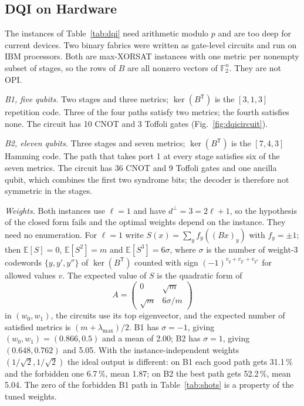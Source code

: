 \documentclass[journal]{IEEEtran}
\begin{document}
\subsection{DQI on Hardware}
\label{sec:hw}

The instances of Table~\ref{tab:dqi} need arithmetic modulo $p$ and are too deep for current devices. Two binary fabrics were written as gate-level circuits and run on IBM processors. %
Both are max-XORSAT instances with one metric per nonempty subset of stages, so the rows of $B$ are all nonzero vectors of $\mathbb{F}_{2}^{n}$. They are not OPI.

\emph{B1, five qubits.} Two stages and three metrics; $\ker(B^{\mathsf T})$ is the $[3,1,3]$ repetition code. Three of the four paths satisfy two metrics; the fourth satisfies none. The circuit has 10 CNOT and 3 Toffoli gates (Fig.~\ref{fig:dqicircuit}).

\emph{B2, eleven qubits.} Three stages and seven metrics; $\ker(B^{\mathsf T})$ is the $[7,4,3]$ Hamming code. The path that takes port 1 at every stage satisfies six of the seven metrics. The circuit has 36 CNOT and 9 Toffoli gates and one ancilla qubit, which combines the first two syndrome bits; the decoder is therefore not symmetric in the stages.

\emph{Weights.} Both instances use $\ell=1$ and have $d^{\perp}=3=2\ell+1$, so the hypothesis of the closed form fails and the optimal weights depend on the instance. They need no enumeration. For $\ell=1$ write $S(x)=\sum_{y}f_{y}((Bx)_{y})$ with $f_{y}=\pm1$; then $\mathbb{E}[S]=0$, $\mathbb{E}[S^{2}]=m$ and $\mathbb{E}[S^{3}]=6\sigma$, where $\sigma$ is the number of weight-3 codewords $\{y,y',y''\}$ of $\ker(B^{\mathsf T})$ counted with sign $(-1)^{v_{y}+v_{y'}+v_{y''}}$ for allowed values $v$. The expected value of $S$ is the quadratic form of
\begin{equation}
  A = \begin{pmatrix} 0 & \sqrt{m} \\ \sqrt{m} & 6\sigma/m \end{pmatrix}
\end{equation}
in $(w_{0},w_{1})$, the circuits use its top eigenvector, and the expected number of satisfied metrics is $(m+\lambda_{\max})/2$. B1 has $\sigma=-1$, giving $(w_{0},w_{1})=(0.866,0.5)$ and a mean of 2.00; B2 has $\sigma=1$, giving $(0.648,0.762)$ and 5.05. With the instance-independent weights $(1/\sqrt2,1/\sqrt2)$ the ideal output is different: on B1 each good path gets 31.1\,\% and the forbidden one 6.7\,\%, mean 1.87; on B2 the best path gets 52.2\,\%, mean 5.04. The zero of the forbidden B1 path in Table~\ref{tab:shots} is a property of the tuned weights.
\end{document}
